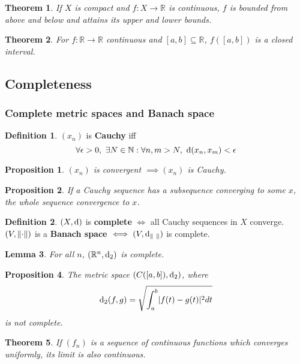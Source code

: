 \documentclass[12pt]{article}
\newtheorem{thm}{Theorem}[section]
\newtheorem{lem}[thm]{Lemma}
\newtheorem{prop}[thm]{Proposition}
\newtheorem*{prop*}{Proposition}
\theoremstyle{definition}
\newtheorem{defn}{Definition}[section]
\DeclarePairedDelimiter\length{\lVert}{\rVert}
\renewcommand{\d}{{\textnormal{d}}}
\begin{document}
\begin{thm}
	If $X$ is compact and $f : X \to \mathbb{R}$ is continuous, $f$ is bounded from above and below and attains its upper and lower bounds.
\end{thm}

\begin{thm}
	For $f : \mathbb{R} \to \mathbb{R}$ continuous and $[a, b] \subseteq \mathbb{R}$, $f([a, b])$ is a closed interval.
\end{thm}

\subsection{Completeness}

\subsubsection{Complete metric spaces and Banach space}

\begin{defn}
	$(x_n)$ is \textbf{Cauchy} iff
	$$\forall \epsilon > 0,\ \exists N \in \mathbb{N} : \forall n, m > N,\ \d(x_n, x_m) < \epsilon$$
\end{defn}

\begin{prop*}
	$(x_n)$ is convergent $\implies (x_n)$ is Cauchy.
\end{prop*}

\begin{prop*}
	If a Cauchy sequence has a subsequence converging to some $x$, the whole sequence convergence to $x$.
\end{prop*}

\begin{defn}
	$(X, \d)$ is \textbf{complete} $\iff$ all Cauchy sequences in $X$ converge.
	$(V, \length{\cdot})$ is a \textbf{Banach space} $\iff (V, \d_{\length{\ }})$ is complete.
\end{defn}

\begin{lem}
	For all $n$, $(\mathbb{R}^n, \d_2)$ is complete.
\end{lem}

\begin{prop}
	The metric space $(C([a, b]), \d_2)$, where
	$$\d_2(f, g) = \sqrt{\int_a^b\lvert f(t) - g(t) \rvert^2dt}$$
	is not complete.
\end{prop}

\begin{thm}
	If $(f_n)$ is a sequence of continuous functions which converges uniformly, its limit is also continuous.
\end{thm}
\end{document}
